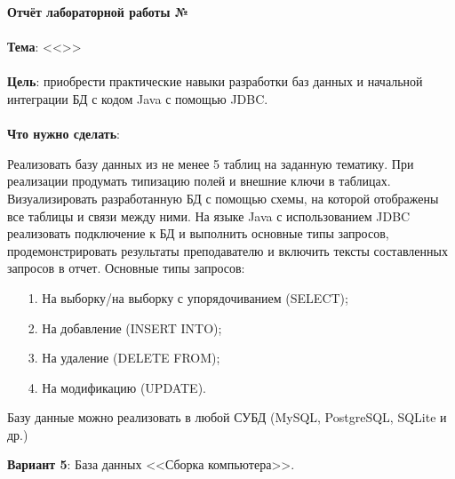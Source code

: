 \documentclass[12pt, a4paper, simple]{eskdtext}
\def \gpiDocTopic {Отчёт лабораторной работы №\gpiDocNum}
\begin{document}
    
    \begin{center}
        \textbf{\gpiDocTopic}
    \end{center}

    \paragraph{} \textbf{Тема}: <<\gpiTopicRep>>

    \paragraph{} \textbf{Цель}:
    приобрести практические навыки разработки баз данных и начальной интеграции БД с кодом Java с помощью JDBC.

    \paragraph{} \textbf{Что нужно сделать}:

    Реализовать базу данных из не менее 5 таблиц на заданную тематику.
    При реализации продумать типизацию полей и внешние ключи в таблицах.
    Визуализировать разработанную БД с помощью схемы, на которой отображены все таблицы и связи между ними.
    На языке Java с использованием JDBC реализовать подключение к БД и выполнить основные типы запросов,
    продемонстрировать результаты преподавателю и включить тексты составленных запросов в отчет.
    Основные типы запросов:
    \begin{enumerate}
        \item[1.] На выборку/на выборку с упорядочиванием (SELECT);
        \item[2.] На добавление (INSERT INTO);
        \item[3.] На удаление (DELETE FROM);
        \item[4.] На модификацию (UPDATE).
    \end{enumerate}
    
    Базу данные можно реализовать в любой СУБД (MySQL, PostgreSQL, SQLite и др.)

    \textbf{Вариант 5}: База данных <<Сборка компьютера>>.


\end{document}
